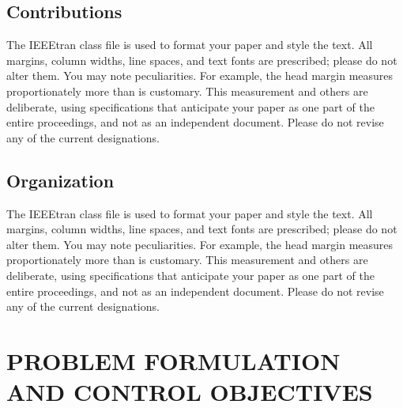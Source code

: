 \documentclass[conference]{IEEEtran}
\begin{document}
\subsection{Contributions}

The IEEEtran class file is used to format your paper and style the text. All margins, 
column widths, line spaces, and text fonts are prescribed; please do not 
alter them. You may note peculiarities. For example, the head margin
measures proportionately more than is customary. This measurement 
and others are deliberate, using specifications that anticipate your paper 
as one part of the entire proceedings, and not as an independent document. 
Please do not revise any of the current designations.

\subsection{Organization}

The IEEEtran class file is used to format your paper and style the text. All margins, 
column widths, line spaces, and text fonts are prescribed; please do not 
alter them. You may note peculiarities. For example, the head margin
measures proportionately more than is customary. This measurement 
and others are deliberate, using specifications that anticipate your paper 
as one part of the entire proceedings, and not as an independent document. 
Please do not revise any of the current designations.



\section{PROBLEM FORMULATION AND CONTROL OBJECTIVES}
\end{document}

